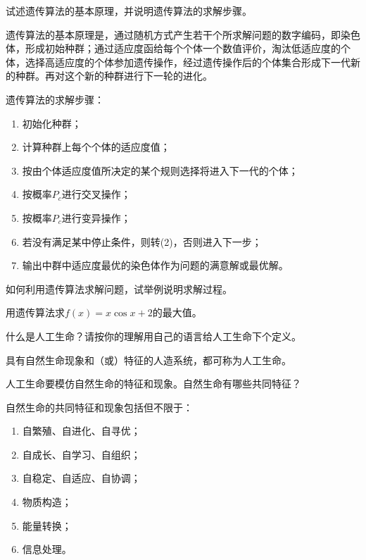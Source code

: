 \begin{question}
试述遗传算法的基本原理，并说明遗传算法的求解步骤。
\end{question}
\begin{solution}
遗传算法的基本原理是，通过随机方式产生若干个所求解问题的数字编码，即染色体，形成初始种群；通过适应度函给每个个体一个数值评价，淘汰低适应度的个体，选择高适应度的个体参加遗传操作，经过遗传操作后的个体集合形成下一代新的种群。再对这个新的种群进行下一轮的进化。\par
遗传算法的求解步骤：\par
	\begin{enumerate}
		\item 初始化种群；
		\item 计算种群上每个个体的适应度值；
		\item 按由个体适应度值所决定的某个规则选择将进入下一代的个体；
		\item 按概率$P_c$进行交叉操作；
		\item 按概率$P_c$进行变异操作；
		\item 若没有满足某中停止条件，则转(2)，否则进入下一步；
		\item 输出中群中适应度最优的染色体作为问题的满意解或最优解。
	\end{enumerate}
\end{solution}

\begin{question}
如何利用遗传算法求解问题，试举例说明求解过程。
\end{question}
\begin{solution}
\end{solution}

\begin{question}
用遗传算法求$f(x)=x\cos x + 2$的最大值。
\end{question}
\begin{solution}
\end{solution}

\begin{question}
什么是人工生命？请按你的理解用自己的语言给人工生命下个定义。
\end{question}
\begin{solution}
具有自然生命现象和（或）特征的人造系统，都可称为人工生命。
\end{solution}

\begin{question}
人工生命要模仿自然生命的特征和现象。自然生命有哪些共同特征？
\end{question}
\begin{solution}
自然生命的共同特征和现象包括但不限于：
	\begin{enumerate}
		\item 自繁殖、自进化、自寻优；
		\item 自成长、自学习、自组织；
		\item 自稳定、自适应、自协调；
		\item 物质构造；
		\item 能量转换；
		\item 信息处理。
	\end{enumerate}
\end{solution}

